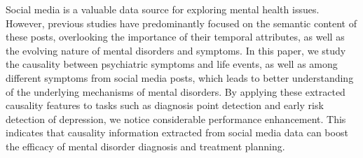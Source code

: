 Social media is a valuable data source for exploring mental health issues.  However, previous studies have predominantly focused on the semantic content of these posts, overlooking the importance of their temporal attributes, as well as the evolving nature of mental disorders and symptoms. In this paper, we study the causality between psychiatric symptoms and life events, as well as among different symptoms from social media posts, which leads to better understanding of the underlying mechanisms of mental disorders. By applying these extracted causality features to tasks such as diagnosis point detection and early risk detection of depression, we notice considerable performance enhancement. This indicates that causality information extracted from social media data can boost the efficacy of mental disorder diagnosis and treatment planning.
